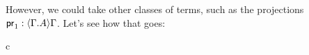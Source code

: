 However, we could take other classes of terms, such as the projections
$\proj1:\ctxwk{\ctxext{\Gamma}{A}}{\Gamma}$. Let's see how that goes:

\begin{infarray}{c}
\\
\end{infarray}

